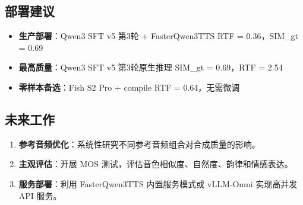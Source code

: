 \documentclass[a4paper, 11pt]{article}
\begin{document}
\subsection{部署建议}

\begin{infobox}
\begin{itemize}[leftmargin=1.5em, itemsep=3pt]
  \item \textbf{生产部署}：Qwen3 SFT v5 第3轮 + FasterQwen3TTS \hfill RTF = 0.36，SIM\_gt = 0.69
  \item \textbf{最高质量}：Qwen3 SFT v5 第3轮原生推理 \hfill SIM\_gt = 0.69，RTF = 2.54
  \item \textbf{零样本备选}：Fish S2 Pro + compile \hfill RTF = 0.64，无需微调
\end{itemize}
\end{infobox}

\subsection{未来工作}

\begin{enumerate}[leftmargin=2em, itemsep=2pt]
  \item \textbf{参考音频优化}：系统性研究不同参考音频组合对合成质量的影响。
  \item \textbf{主观评估}：开展 MOS 测试，评估音色相似度、自然度、韵律和情感表达。
  \item \textbf{服务部署}：利用 FasterQwen3TTS 内置服务模式或 vLLM-Omni 实现高并发 API 服务。
\end{enumerate}
\end{document}

